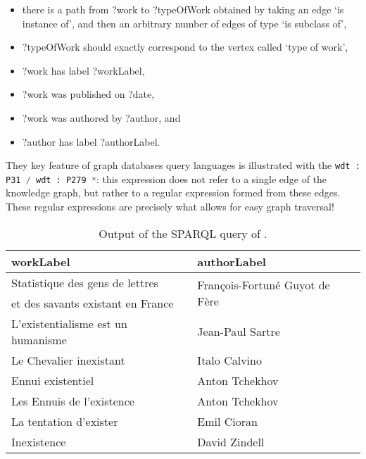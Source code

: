 \begin{itemize}
	\item there is a path from \textsf{?work} to \textsf{?typeOfWork}
		obtained by taking an edge `is instance of', and then an arbitrary number
		of edges of type `is subclass of',
	\item \textsf{?typeOfWork} should exactly correspond to the vertex called `type of work',
	\item \textsf{?work} has label \textsf{?workLabel}, 
	\item \textsf{?work} was published on \textsf{?date},
	\item \textsf{?work} was authored by \textsf{?author}, and
	\item \textsf{?author} has label \textsf{?authorLabel}.
\end{itemize}
They key feature of graph databases query languages is illustrated
with the \lstinline[language=SQL]{wdt : P31 / wdt : P279 *}:
this expression does not refer to a single edge of the knowledge graph,
but rather to a regular expression formed from these edges.
These regular expressions are precisely what allows for easy graph traversal!

\begin{table}
	\centering
	{
		\footnotesize%
		\begin{tabular}{ll}
			\toprule
			workLabel & authorLabel \\ \midrule 
			Statistique des gens de lettres 
				& \multirow{2}{*}{François-Fortuné Guyot de Fère}\\
			et des savants existant en France
				& \\
			L'existentialisme est un humanisme
				& Jean-Paul Sartre\\
			Le Chevalier inexistant
				& Italo Calvino\\
			Ennui existentiel
				& Anton Tchekhov\\
			Les Ennuis de l'existence
				& Anton Tchekhov\\
			La tentation d'exister
				& Emil Cioran\\
			Inexistence
				& David Zindell \\ \bottomrule
		\end{tabular}
	}
	\caption{Output of the SPARQL query of .}
\end{table}